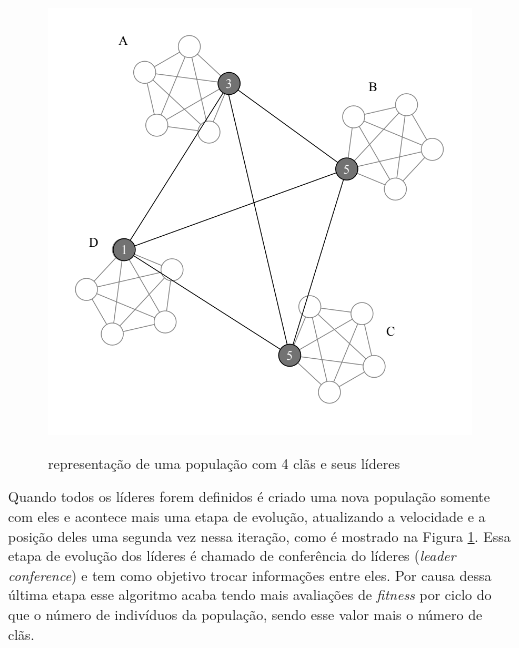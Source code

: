 \begin{figure}[!htb]
	\caption{representação de uma população com 4 clãs e seus líderes}
	\centering
	\includegraphics[scale=0.6]{images/cpso_leader_conference.png}
	\label{fig:cpso_leader_conference}
\end{figure}

Quando todos os líderes forem definidos é criado uma nova população somente com eles e acontece mais uma etapa de evolução, atualizando a velocidade e a posição deles uma segunda vez nessa iteração, como é mostrado na Figura \ref{fig:cpso_leader_conference}. Essa etapa de evolução dos líderes é chamado de conferência do líderes (\textit{leader conference}) e tem como objetivo trocar informações entre eles. Por causa dessa última etapa esse algoritmo acaba tendo mais avaliações de \textit{fitness} por ciclo do que o número de indivíduos da população, sendo esse valor mais o número de clãs.

